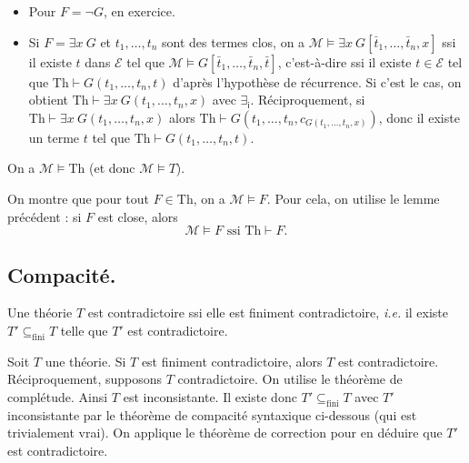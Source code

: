 \documentclass[./main]{subfiles}
\begin{document}
\begin{prv}
\begin{itemize}
\begin{itemize}
          \item réciproquement, on utilise le lemme~\ref{prop:fol-ou-ssi-ou} car $\mathrm{Th}$ est complète.
        \end{itemize}
      \item Pour $F = \lnot G$, en exercice.
      \item Si  $F = \exists x \: G$ et $t_1, \ldots, t_n$ sont des termes clos, on a $\mathcal{M} \models \exists x \: G[\bar{t}_1, \ldots, \bar{t}_n, x]$ 
        ssi il existe $t$ dans $\mathcal{E}$ tel que $\mathcal{M} \models G[\bar{t}_1, \ldots, \bar{t}_n, \bar{t}]$, c'est-à-dire
        ssi il existe $t \in \mathcal{E}$ tel que $\mathrm{Th} \vdash G(t_1, \ldots, t_n,t)$ d'après l'hypothèse de récurrence.
        Si c'est le cas, on obtient $\mathrm{Th} \vdash \exists x \: G(t_1, \ldots, t_n, x)$ avec $\exists_\mathsf{i}$.
        Réciproquement, si $\mathrm{Th} \vdash \exists x \: G(t_1, \ldots, t_n, x)$ alors $\mathrm{Th} \vdash G(t_1, \ldots, t_n, c_{G(t_1, \ldots, t_n, x)})$, donc il existe un terme $t$ tel que $\mathrm{Th} \vdash G(t_1, \ldots, t_n, t)$.
    \end{itemize}
  \end{prv}


  \begin{lem}
    On a $\mathcal{M} \models \mathrm{Th}$ (et donc $\mathcal{M} \models T$).
  \end{lem}

  \begin{prv}
    On montre que pour tout $F \in \mathrm{Th}$, on a $\mathcal{M} \models F$.
    Pour cela, on utilise le lemme précédent : si $F$ est close, alors
    \[
    \mathcal{M} \models F \text{ ssi } \mathrm{Th} \vdash F
    .\]
  \end{prv}

  \subsection{Compacité.}

  \begin{thm}
    Une théorie $T$ est contradictoire ssi elle est finiment contradictoire, \textit{i.e.} il existe $T' \subseteq_\mathrm{fini} T$ telle que $T'$ est contradictoire.
  \end{thm}
  \begin{prv}
    Soit $T$ une théorie. Si $T$ est finiment contradictoire, alors $T$ est contradictoire.
    Réciproquement, supposons $T$ contradictoire.
    On utilise le théorème de complétude.
    Ainsi $T$ est inconsistante.
    Il existe donc $T' \subseteq_\mathrm{fini} T$ avec $T'$ inconsistante par le théorème de compacité syntaxique ci-dessous (qui est trivialement vrai).
    On applique le théorème de correction pour en déduire que $T'$ est contradictoire.
  \end{prv}
\end{document}
